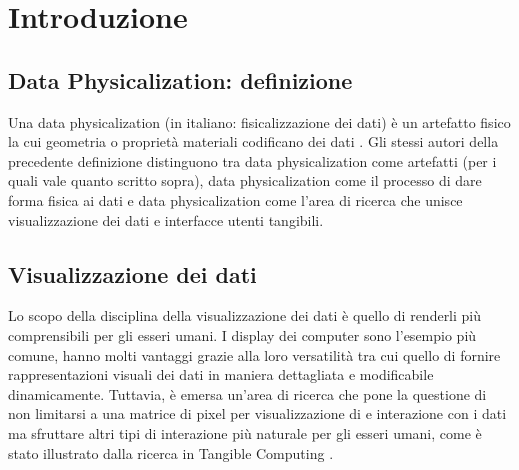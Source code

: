 \documentclass[12pt,a4paper]{report}
\begin{document}

\chapter{Introduzione}
\section{Data Physicalization: definizione}
Una data physicalization (in italiano: fisicalizzazione dei dati) è un artefatto fisico la cui geometria o proprietà materiali codificano dei dati \cite{dataphysorg:terminology}.
Gli stessi autori della precedente definizione distinguono tra data physicalization come artefatti (per i quali vale quanto scritto sopra),
data physicalization come il processo di dare forma fisica ai dati e data physicalization come l'area di ricerca che unisce visualizzazione
dei dati e interfacce utenti tangibili.

\section{Visualizzazione dei dati}
Lo scopo della disciplina della visualizzazione dei dati è quello di renderli più comprensibili per gli esseri umani. I display dei computer
sono l'esempio più comune, hanno molti vantaggi grazie alla loro versatilità tra cui quello di fornire rappresentazioni visuali dei dati in
maniera dettagliata e modificabile dinamicamente. Tuttavia, è emersa un'area di ricerca che pone la questione di non limitarsi a una
matrice di pixel per visualizzazione di e interazione con i dati ma sfruttare altri tipi di interazione più naturale per gli esseri umani, come
è stato illustrato dalla ricerca in Tangible Computing \cite{hal:dataphys}.
\end{document}

